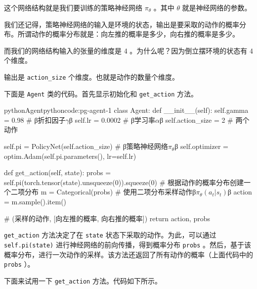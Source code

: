 \documentclass[lang=cn,newtx,10pt,scheme=chinese]{elegantbook}
\newcommand{\py}[1]{%
  \colorbox{gray!10}{\texttt{#1}}%
}
\begin{document}
这个网络结构就是我们要训练的策略神经网络 $\pi_\theta$ 。其中 $\theta$ 就是神经网络的参数。

我们还记得，策略神经网络的输入是环境的状态，输出是要采取的动作的概率分布。所谓动作的概率分布就是：向左推的概率是多少，向右推的概率是多少。

而我们的网络结构输入的张量的维度是 4 。为什么呢？因为倒立摆环境的状态有 4 个维度。

输出是\py{action_size}个维度。也就是动作的数量个维度。


下面是 \py{Agent} 类的代码。首先显示初始化和 \py{get_action} 方法。

\begin{codebox}{python}{Agent}{pythoncode:pg-agent-1}
class Agent:
    def __init__(self):
        self.gamma = 0.98 # β折扣因子$\gamma$β
        self.lr = 0.0002 # β学习率$\alpha$β
        self.action_size = 2 # 两个动作

        self.pi = PolicyNet(self.action_size) # β策略神经网络$\pi_\theta$β
        self.optimizer = optim.Adam(self.pi.parameters(), lr=self.lr)

    def get_action(self, state):
        probs = self.pi(torch.tensor(state).unsqueeze(0)).squeeze(0)
        # 根据动作的概率分布创建一个二项分布
        m = Categorical(probs)
        # 使用二项分布采样动作β$\pi_\theta(a_t|s_t)$β
        action = m.sample().item()

        # (采样的动作, [向左推的概率, 向右推的概率])
        return action, probs
\end{codebox}

\py{get_action} 方法决定了在 \py{state} 状态下采取的动作。为此，可以通过 \py{self.pi(state)} 进行神经网络的前向传播，得到概率分布 \py{probs} 。然后，基于该概率分布，进行一次动作的采样。该方法还返回了所有动作的概率（上面代码中的\py{probs}）。

下面来试用一下 \py{get_action} 方法。代码如下所示。
\end{document}
